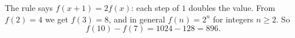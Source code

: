 The rule says $f(x+1)=2f(x)$: each step of $1$ doubles the value. From $f(2)=4$ we get $f(3)=8$, and in general $f(n)=2^n$ for integers $n\ge2$. So
\[
f(10)-f(7)=1024-128=\boxed{896}.
\]
